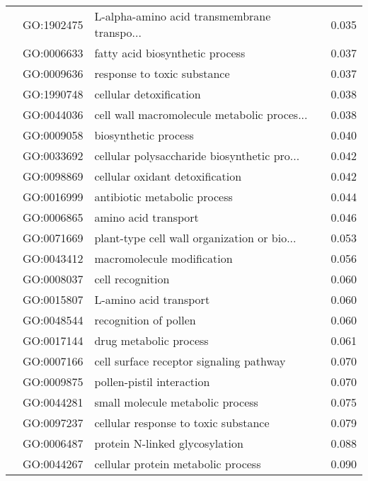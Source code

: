 \begin{longtable}{lllr}
   & GO:1902475 &  L-alpha-amino acid transmembrane transpo... &         0.035 \\
   & GO:0006633 &              fatty acid biosynthetic process &         0.037 \\
   & GO:0009636 &                  response to toxic substance &         0.037 \\
   & GO:1990748 &                      cellular detoxification &         0.038 \\
   & GO:0044036 &  cell wall macromolecule metabolic proces... &         0.038 \\
   & GO:0009058 &                         biosynthetic process &         0.040 \\
   & GO:0033692 &  cellular polysaccharide biosynthetic pro... &         0.042 \\
   & GO:0098869 &              cellular oxidant detoxification &         0.042 \\
   & GO:0016999 &                 antibiotic metabolic process &         0.044 \\
   & GO:0006865 &                         amino acid transport &         0.046 \\
   & GO:0071669 &  plant-type cell wall organization or bio... &         0.053 \\
   & GO:0043412 &                   macromolecule modification &         0.056 \\
   & GO:0008037 &                             cell recognition &         0.060 \\
   & GO:0015807 &                       L-amino acid transport &         0.060 \\
   & GO:0048544 &                        recognition of pollen &         0.060 \\
   & GO:0017144 &                       drug metabolic process &         0.061 \\
   & GO:0007166 &      cell surface receptor signaling pathway &         0.070 \\
   & GO:0009875 &                    pollen-pistil interaction &         0.070 \\
   & GO:0044281 &             small molecule metabolic process &         0.075 \\
   & GO:0097237 &         cellular response to toxic substance &         0.079 \\
   & GO:0006487 &               protein N-linked glycosylation &         0.088 \\
   & GO:0044267 &           cellular protein metabolic process &         0.090 \\

\end{longtable}
